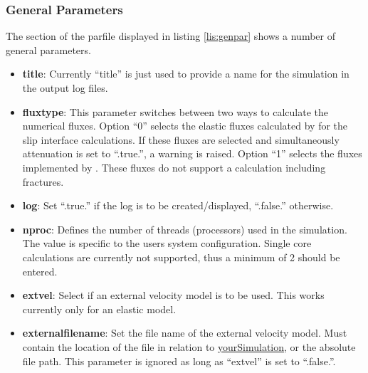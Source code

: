 		\subsubsection{General Parameters}
		\label{subsec:genpar}
			
			The section of the parfile displayed in listing \ref{lis:genpar} shows a number of general parameters. 	
			\begin{itemize}
				\item \textbf{title}: Currently ``title'' is just used to provide a name for the simulation in the output log files.
				\item \textbf{fluxtype}: This parameter switches between two ways to calculate the numerical fluxes. Option ``0'' selects the elastic fluxes calculated by \cite{Moeller.2018} for the slip interface calculations. If these fluxes are selected and simultaneously attenuation is set to ``.true.'', a warning is raised. Option ``1'' selects the fluxes implemented by \citep{Lambrecht.2015}. These fluxes do not support a calculation including fractures.
				\item \textbf{log}: Set ``.true.'' if the log is to be created/displayed, ``.false.'' otherwise.
				\item \textbf{nproc}: Defines the number of threads (processors) used in the simulation. The value is specific to the users system configuration. Single core calculations are currently not supported, thus a minimum of 2 should be entered.
				\item \textbf{extvel}: Select if an external velocity model is to be used. This works currently only for an elastic model.
				\item \textbf{externalfilename}: Set the file name of the external velocity model. Must contain the location of the file in relation to \url{yourSimulation}, or the absolute file path. This parameter is ignored as long as ``extvel'' is set to ``.false.''. 
			\end{itemize}
